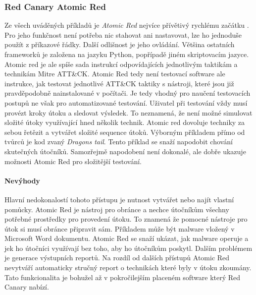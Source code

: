 
\subsubsection{Red Canary Atomic Red}
Ze všech uváděných příkladů je \textit{Atomic Red} nejvíce přívětivý rychlému začátku .
Pro jeho funkčnost není potřeba nic stahovat ani nastavovat, lze ho jednoduše použít z příkazové řádky\cite{redcanary_atomic_red}.
Další odlišnost je jeho ovládání.
Většina ostatních frameworků je založena na jazyku Python, popřípadě jiném skriptovacím jazyce.
Atomic red je ale spíše sada instrukcí odpovídajících jednotlivým taktikám a technikám Mitre ATT\&CK\@.
Atomic Red tedy není testovací software ale instrukce, jak testovat jednotlivé ATT\&CK taktiky s nástroji, které jsou již pravděpodobně nainstalované v počítači.
Je tedy vhodný pro naučení testovacích postupů ne však pro automatizované testování.
Uživatel při testování vždy musí provézt kroky útoku a sledovat výsledek.
To neznamená, že není možné simulovat složité útoky využívající hned několik technik.
Atomic red dovoluje techniky za sebou řetězit a vytvářet složité sequence útoků.
Výborným příkladem přímo od tvůrců je kod zvaný \textit{Dragons tail}\cite{redcanary_dragons_tail}.
Tento příklad se snaží napodobit chování skutečných útočníků.
Samozřejmě napodobení není dokonalé, ale dobře ukazuje možnosti Atomic Red pro složitější testování.\cite{csoonline_4_testing_frameworks}

\paragraph{Nevýhody}
Hlavní nedokonalostí tohoto přístupu je nutnost vytvářet nebo najít vlastní pomůcky.
Atomic Red je nástroj pro obránce a nechce útočníkům všechny potřebné prostředky pro provedení útoku.
To znamená že pomocné nástroje pro útok si musí obránce připravit sám.
Příkladem může být malware vložený v Microsoft Word dokumentu.
Atomic Red se snaží ukázat, jak malware operuje a jek ho útočníci využívají bez toho, aby ho útočníkům poskytl.
Dalším problémem je generace výstupních reportů.
Na rozdíl od dalších přístupů Atomic Red nevytváří automaticky stručný report o technikách které byly v útoku zkoumány.
Tato funkcionalita je bohužel až v pokročilejším placeném software který Red Canary nabízí.\cite{csoonline_4_testing_frameworks}

